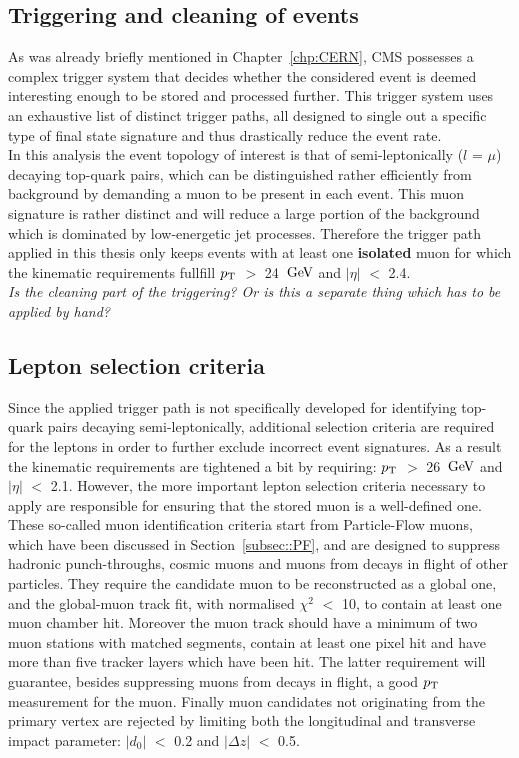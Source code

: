 \subsection{Triggering and cleaning of events}\label{subsec::Trigger}
As was already briefly mentioned in Chapter~\ref{chp:CERN}, CMS possesses a complex trigger system that decides whether the considered event is deemed interesting enough to be stored and processed further.
This trigger system uses an exhaustive list of distinct trigger paths, all designed to single out a specific type of final state signature and thus drastically reduce the event rate.
\\

In this analysis the event topology of interest is that of semi-leptonically ($l$ = $\mu$) decaying top-quark pairs, which can be distinguished rather efficiently from background by demanding a muon to be present in each event. This muon signature is rather distinct and will reduce a large portion of the background which is dominated by low-energetic jet processes.
Therefore the trigger path applied in this thesis only keeps events with at least one \textbf{isolated} muon for which the kinematic requirements fullfill $p_{\rm T}$ $>$ 24 $\, \mathrm{GeV}$ and $\vert \eta \vert$ $<$ 2.4.
\\
\textit{Is the cleaning part of the triggering? Or is this a separate thing which has to be applied by hand?}

\subsection{Lepton selection criteria}
Since the applied trigger path is not specifically developed for identifying top-quark pairs decaying semi-leptonically, additional selection criteria are required for the leptons in order to further exclude incorrect event signatures. As a result the kinematic requirements are tightened a bit by requiring: $p_{\rm T}$ $>$ 26 $\, \mathrm{GeV}$ and $\vert \eta \vert$ $<$ 2.1.
However, the more important lepton selection criteria necessary to apply are responsible for ensuring that the stored muon is a well-defined one.
\\
These so-called muon identification criteria start from Particle-Flow muons, which have been discussed in Section~\ref{subsec::PF}, and are designed to suppress hadronic punch-throughs, cosmic muons and muons from decays in flight of other particles.
They require the candidate muon to be reconstructed as a global one, and the global-muon track fit, with normalised $\chi^{2}$ $<$ 10, to contain at least one muon chamber hit.
Moreover the muon track should have a minimum of two muon stations with matched segments, contain at least one pixel hit and have more than five tracker layers which have been hit. The latter requirement will guarantee, besides suppressing muons from decays in flight, a good $p_{\rm T}$ measurement for the muon.
Finally muon candidates not originating from the primary vertex are rejected by limiting both the longitudinal and transverse impact parameter: $\vert d_0 \vert$ $<$ 0.2 and $\vert \Delta z \vert$ $<$ 0.5.

